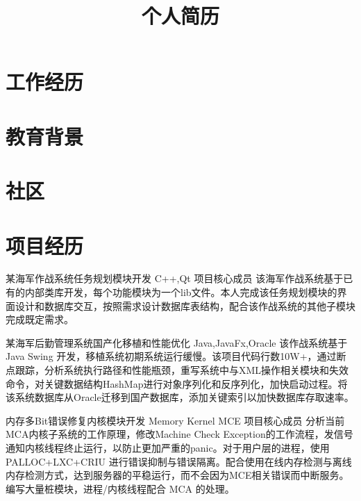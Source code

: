 \documentclass[11pt,a4paper]{moderncv}
\title{个人简历}                      %
\begin{document}
\maketitle

\section{工作经历}

\section{教育背景}


\section{社区}

\section{项目经历}
\renewcommand{\baselinestretch}{1.2}
{某海军作战系统任务规划模块开发}
{C++,Qt}
{}{项目核心成员}
{该海军作战系统基于已有的内部类库开发，每个功能模块为一个lib文件。本人完成该任务规划模块的界面设计和数据库交互，按照需求设计数据库表结构，配合该作战系统的其他子模块完成既定需求。}

{某海军后勤管理系统国产化移植和性能优化}
{Java,JavaFx,Oracle}
{}{}
{该作战系统基于 Java Swing 开发，移植系统初期系统运行缓慢。该项目代码行数10W+，通过断点跟踪，分析系统执行路径和性能瓶颈，重写系统中与XML操作相关模块和失效命令，对关键数据结构HashMap进行对象序列化和反序列化，加快启动过程。将该系统数据库从Oracle迁移到国产数据库，添加关键索引以加快数据库存取速率。}

{内存多Bit错误修复内核模块开发}
{Memory Kernel MCE}
{}{项目核心成员}
{分析当前MCA内核子系统的工作原理，修改Machine Check Exception的工作流程，发信号通知内核线程终止运行，以防止更加严重的panic。对于用户层的进程，使用PALLOC+LXC+CRIU 进行错误抑制与错误隔离。配合使用在线内存检测与离线内存检测方式，达到服务器的平稳运行，而不会因为MCE相关错误而中断服务。编写大量桩模块，进程/内核线程配合 MCA 的处理。}
\end{document}
